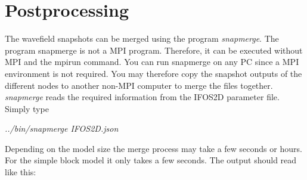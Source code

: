 \section{Postprocessing}  
The wavefield snapshots can be merged using the program \textit{snapmerge}. The program snapmerge is not a MPI program. Therefore, it can be executed without MPI and the mpirun command. You can run snapmerge on any PC since a MPI environment is not required. You may therefore copy the snapshot outputs of the different nodes to another non-MPI computer to merge the files together. \textit{snapmerge} reads the required information from the IFOS2D parameter file. Simply type
\newline

\textit{../bin/snapmerge IFOS2D.json}
\newline

Depending on the model size the merge process may take a few seconds or hours. For the simple block model it only takes a few seconds. The output should read like this:
{\color{blue}{\begin{verbatim}
 pressure (files: ./snap/test.bin.p.??? ).

 writing merged snapshot file to  ./snap/test.bin.p
 Opening snapshot files: ./snap/test.bin.p.???  ... finished.
 Copying... ... finished.
 Use
 xmovie n1=100 n2=100 < ./snap/test.bin.p loop=1 label1=Y label2=X title=%g
 to play movie.
\end{verbatim}}}